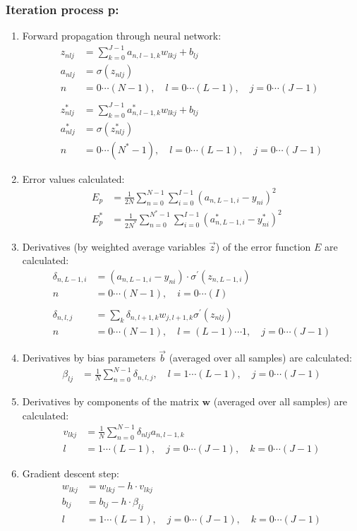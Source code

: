 \documentclass[10pt]{article}
\begin{document}
\subsubsection*{Iteration process p:}
\begin{enumerate}
\item
Forward propagation through neural network:
\begin{align}
 z_{nlj}&= \sum_{k=0}^{J-1} a_{n,l-1,k} w_{lkj} + b_{lj}\\
 a_{nlj}&= \sigma(z_{nlj})  \\
 \nonumber n&=0\cdots (N-1), \quad  l=0\cdots (L-1), \quad j=0\cdots (J-1) \\
  \nonumber \\
 z_{nlj}^*&= \sum_{k=0}^{J-1} a_{n,l-1,k}^* w_{lkj} + b_{lj}\\
 a_{nlj}^*&= \sigma(z_{nlj}^*)  \\
 \nonumber n&=0\cdots (N^*-1), \quad  l=0\cdots (L-1), \quad j=0\cdots (J-1) 
\end{align}
\item Error values calculated:
\begin{align}
 E_p &= \frac{1}{2N}\sum_{n=0}^{N-1} \sum_{i=0}^{I-1} (a_{n,L-1,i} - y_{ni})^2\\
 E_p^* &= \frac{1}{2N^*}\sum_{n=0}^{N^*-1} \sum_{i=0}^{I-1} (a^*_{n,L-1,i} - y^*_{ni})^2 \quad 
\end{align}
\item Derivatives (by weighted average variables $\vec z$) of the error function $E$ are calculated:
\begin{align}
 \delta_{n,L-1,i} &= (a_{n,L-1,i} - y_{ni})\cdot \sigma^{'}(z_{n,L-1,i})\\
 \nonumber  n&=0\cdots (N-1), \quad i=0\cdots (I) \\
 \nonumber\\
 \delta_{n,l,j} &=\sum_k \delta_{n,l+1,k} w_{j,l+1,k} \sigma^{'}(z_{nlj}) \\
  \nonumber n&=0\cdots (N-1), \quad  l= (L-1)\cdots 1, \quad j=0\cdots (J-1) 
\end{align}
\item Derivatives by bias parameters $\vec b$ (averaged over all samples) are calculated:
\begin{align}
\beta_{lj} &= \frac{1}{N}\sum_{n=0}^{N-1} \delta_{n,l,j}, \quad  l= 1 \cdots (L-1), \quad j=0\cdots (J-1) 
\end{align}
\item Derivatives by components of the matrix $\textbf{w}$ (averaged over all samples) are calculated:
\begin{align}
v_{lkj} &= \frac{1}{N}\sum_{n=0}^{N-1} \delta_{nlj} a_{n,l-1,k} \\
\nonumber  l &= 1 \cdots (L-1), \quad j=0 \cdots (J-1), \quad k=0 \cdots (J-1) 
\end{align}
\item Gradient descent step:
\begin{align}
w_{lkj} &= w_{lkj} - h \cdot v_{lkj}\\
b_{lj} &= b_{lj} - h \cdot \beta_{lj}\\
\nonumber  l &= 1 \cdots (L-1), \quad j=0 \cdots (J-1), \quad k=0 \cdots (J-1) 
\end{align}
\end{enumerate}
\end{document}
